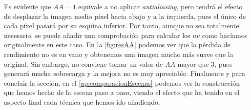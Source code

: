 Es evidente que $AA=1$ equivale a no aplicar \textit{antialiasing}, pero tendrá el efecto de desplazar la imagen medio píxel hacia abajo y a la izquierda, pues el único de cada píxel pasará por su esquina inferior. Por tanto, aunque no sea totalmente necesario, se puede añadir una comprobación para calcular los $uv$ como hacíamos originalmente en este caso. En la \autoref{fig:resAA} podemos ver que la pérdida de rendimiento no es en vano y obtenemos una imagen mucho más suave que la original. Sin embargo, no conviene tomar un valor de $AA$ mayor que $3$, pues generará mucha sobrecarga y la mejora no es muy apreciable. Finalmente y para concluir la sección, en el \autoref{ap:comparacionEscenas} podemos ver la construcción que hemos hecho de la escena paso a paso, viendo el efecto que ha tenido en el aspecto final cada técnica que hemos ido añadiendo.


